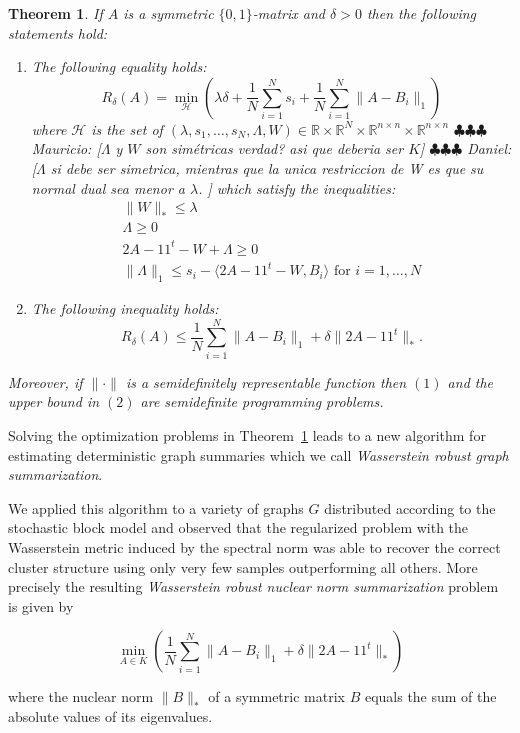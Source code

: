 \documentclass[12pt]{amsart}
\newtheorem{theorem}[lemma]{Theorem}
\theoremstyle{remark}
\newcommand{\RR}{\mathbb{R}}
\newcommand{\ddr}[1]{{\color{blue} \sf $\clubsuit\clubsuit\clubsuit$ Daniel: [#1]}}
\newcommand{\mv}[1]{{\color{red} \sf $\clubsuit\clubsuit\clubsuit$ Mauricio: [#1]}}
\begin{document}
\begin{theorem}\label{Thm: tractable}If $A$ is a symmetric $\{0,1\}$-matrix and $\delta>0$ then the following statements hold:
\begin{enumerate}
\item{  The following equality holds:
\[
R_{\delta}(A)=\min_{\mathcal{H}} \left(\lambda\delta +\frac{1}{N}\sum_{i=1}^N s_i+\frac{1}{N}\sum_{i=1}^N\|A-B_i\|_1\right)
\]
where $\mathcal{H}$ is the set of $(\lambda, s_1,\dots, s_N,\Lambda, W)\in \RR\times\RR^N\times \RR^{n\times n} \times \RR^{n\times n}$ \mv{$\Lambda$ y $W$ son sim\'etricas verdad? asi que deberia ser $K$} \ddr{$\Lambda$ si debe ser simetrica, mientras que la unica restriccion de W es que su normal dual sea menor a $\lambda$. } which satisfy the inequalities:
\[
\begin{array}{l}
\|W\|_{*}\leq \lambda\\
\Lambda \geq 0\\
2A-11^t-W + \Lambda \geq 0\\
\|\Lambda\|_{1}\leq s_i-\langle 2A-11^t-W, B_i\rangle\text{ for $i=1,\dots, N$}
\end{array}
\]}
\item The following inequality holds:
\[R_{\delta}(A)\leq \frac{1}{N}\sum_{i=1}^N\|A-B_i\|_1+ \delta\|2A-11^t\|_*.\]
\end{enumerate}
Moreover, if $\|\cdot\|$ is a semidefinitely representable function then $(1)$ and the upper bound in $(2)$ are semidefinite programming problems.
\end{theorem}

Solving the optimization problems in Theorem~\ref{Thm: tractable} leads to a new algorithm for estimating deterministic graph summaries which we call {\it Wasserstein robust graph summarization}. 

We applied this algorithm to a variety of graphs $G$ distributed according to the stochastic block model and observed that the regularized problem with the Wasserstein metric induced by the spectral norm was able to recover the correct cluster structure using only very few samples outperforming all others. More precisely the resulting {\it Wasserstein robust nuclear norm summarization} problem is given by

\begin{equation}\label{WRNNS}
\min_{A\in K} \left(\frac{1}{N}\sum_{i=1}^N\|A-B_i\|_1+ \delta\|2A-11^t\|_*\right) 
\end{equation}

where the nuclear norm $\|B\|_*$ of a symmetric matrix $B$ equals the sum of the absolute values of its eigenvalues.
\end{document}
